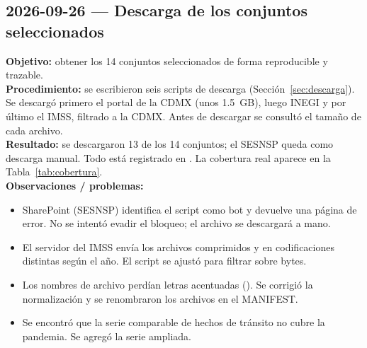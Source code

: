 \subsection{2026-09-26 --- Descarga de los conjuntos seleccionados}
\textbf{Objetivo:} obtener los 14 conjuntos seleccionados de forma reproducible y trazable.\\
\textbf{Procedimiento:} se escribieron seis scripts de descarga (Sección~\ref{sec:descarga}). Se
descargó primero el portal de la CDMX (unos 1.5~GB), luego INEGI y por último el IMSS, filtrado a
la CDMX. Antes de descargar se consultó el tamaño de cada archivo.\\
\textbf{Resultado:} se descargaron 13 de los 14 conjuntos; el SESNSP queda como descarga manual. Todo
está registrado en . La cobertura real aparece en la Tabla~\ref{tab:cobertura}.\\
\textbf{Observaciones / problemas:}
\begin{itemize}
  \item SharePoint (SESNSP) identifica el script como bot y devuelve una página de error. No se intentó
        evadir el bloqueo; el archivo se descargará a mano.
  \item El servidor del IMSS envía los archivos comprimidos y en codificaciones distintas según el año.
        El script se ajustó para filtrar sobre bytes.
  \item Los nombres de archivo perdían letras acentuadas (). Se corrigió la
        normalización y se renombraron los archivos en el MANIFEST.
  \item Se encontró que la serie comparable de hechos de tránsito no cubre la pandemia. Se agregó la
        serie ampliada.
\end{itemize}

